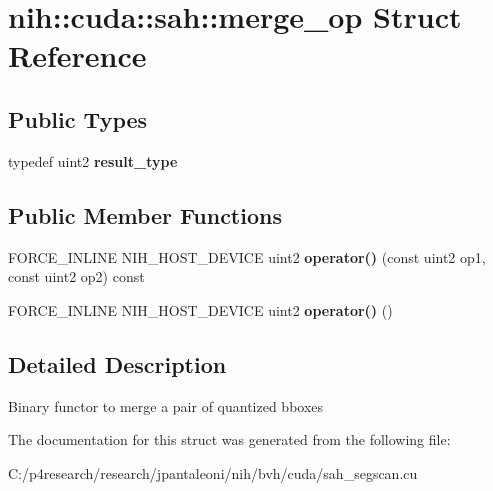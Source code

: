 \hypertarget{structnih_1_1cuda_1_1sah_1_1merge__op}{
\section{nih\-:\-:cuda\-:\-:sah\-:\-:merge\-\_\-op \-Struct \-Reference}
\label{structnih_1_1cuda_1_1sah_1_1merge__op}
}
\subsection*{\-Public \-Types}
\begin{DoxyCompactItemize}
\item 
\hypertarget{structnih_1_1cuda_1_1sah_1_1merge__op_a56bb29119386fa2eb934bc962500a7b7}{
typedef uint2 {\bfseries result\-\_\-type}}
\label{structnih_1_1cuda_1_1sah_1_1merge__op_a56bb29119386fa2eb934bc962500a7b7}

\end{DoxyCompactItemize}
\subsection*{\-Public \-Member \-Functions}
\begin{DoxyCompactItemize}
\item 
\hypertarget{structnih_1_1cuda_1_1sah_1_1merge__op_a0b5f526ed3c99859308a0b74b38f84de}{
\-F\-O\-R\-C\-E\-\_\-\-I\-N\-L\-I\-N\-E \-N\-I\-H\-\_\-\-H\-O\-S\-T\-\_\-\-D\-E\-V\-I\-C\-E uint2 {\bfseries operator()} (const uint2 op1, const uint2 op2) const }
\label{structnih_1_1cuda_1_1sah_1_1merge__op_a0b5f526ed3c99859308a0b74b38f84de}

\item 
\hypertarget{structnih_1_1cuda_1_1sah_1_1merge__op_ae8edcf8580a40503ab9a80cb92084e02}{
\-F\-O\-R\-C\-E\-\_\-\-I\-N\-L\-I\-N\-E \-N\-I\-H\-\_\-\-H\-O\-S\-T\-\_\-\-D\-E\-V\-I\-C\-E uint2 {\bfseries operator()} ()}
\label{structnih_1_1cuda_1_1sah_1_1merge__op_ae8edcf8580a40503ab9a80cb92084e02}

\end{DoxyCompactItemize}


\subsection{\-Detailed \-Description}
\-Binary functor to merge a pair of quantized bboxes 

\-The documentation for this struct was generated from the following file\-:\begin{DoxyCompactItemize}
\item 
\-C\-:/p4research/research/jpantaleoni/nih/bvh/cuda/sah\-\_\-segscan.\-cu\end{DoxyCompactItemize}
